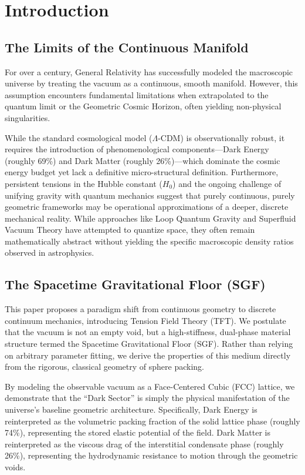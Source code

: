 \chapter{Introduction}

\section{The Limits of the Continuous Manifold}
For over a century, General Relativity has successfully modeled the macroscopic universe by treating the vacuum as a continuous, smooth manifold. However, this assumption encounters fundamental limitations when extrapolated to the quantum limit or the Geometric Cosmic Horizon, often yielding non-physical singularities.

While the standard cosmological model ($\Lambda$-CDM) is observationally robust, it requires the introduction of phenomenological components---Dark Energy (roughly 69\%) and Dark Matter (roughly 26\%)---which dominate the cosmic energy budget yet lack a definitive micro-structural definition. Furthermore, persistent tensions in the Hubble constant ($H_0$) and the ongoing challenge of unifying gravity with quantum mechanics suggest that purely continuous, purely geometric frameworks may be operational approximations of a deeper, discrete mechanical reality. While approaches like Loop Quantum Gravity and Superfluid Vacuum Theory have attempted to quantize space, they often remain mathematically abstract without yielding the specific macroscopic density ratios observed in astrophysics.

\section{The Spacetime Gravitational Floor (SGF)}
This paper proposes a paradigm shift from continuous geometry to discrete continuum mechanics, introducing Tension Field Theory (TFT). We postulate that the vacuum is not an empty void, but a high-stiffness, dual-phase material structure termed the Spacetime Gravitational Floor (SGF). Rather than relying on arbitrary parameter fitting, we derive the properties of this medium directly from the rigorous, classical geometry of sphere packing.

By modeling the observable vacuum as a Face-Centered Cubic (FCC) lattice, we demonstrate that the ``Dark Sector'' is simply the physical manifestation of the universe's baseline geometric architecture. Specifically, Dark Energy is reinterpreted as the volumetric packing fraction of the solid lattice phase (roughly 74\%), representing the stored elastic potential of the field. Dark Matter is reinterpreted as the viscous drag of the interstitial condensate phase (roughly 26\%), representing the hydrodynamic resistance to motion through the geometric voids.

